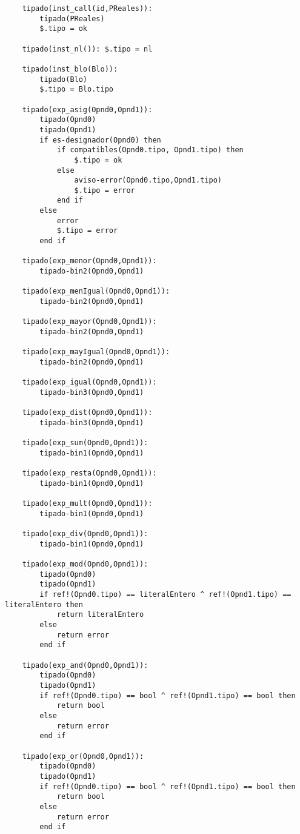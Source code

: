 \begin{lstlisting}
    tipado(inst_call(id,PReales)):
        tipado(PReales)
        $.tipo = ok

    tipado(inst_nl()): $.tipo = nl

    tipado(inst_blo(Blo)):
        tipado(Blo)
        $.tipo = Blo.tipo

    tipado(exp_asig(Opnd0,Opnd1)):
        tipado(Opnd0)
        tipado(Opnd1)
        if es-designador(Opnd0) then
            if compatibles(Opnd0.tipo, Opnd1.tipo) then
                $.tipo = ok
            else 
                aviso-error(Opnd0.tipo,Opnd1.tipo)
                $.tipo = error
            end if
        else
            error
            $.tipo = error
        end if

    tipado(exp_menor(Opnd0,Opnd1)):
        tipado-bin2(Opnd0,Opnd1)

    tipado(exp_menIgual(Opnd0,Opnd1)):
        tipado-bin2(Opnd0,Opnd1)

    tipado(exp_mayor(Opnd0,Opnd1)):
        tipado-bin2(Opnd0,Opnd1)

    tipado(exp_mayIgual(Opnd0,Opnd1)):
        tipado-bin2(Opnd0,Opnd1)

    tipado(exp_igual(Opnd0,Opnd1)):
        tipado-bin3(Opnd0,Opnd1)

    tipado(exp_dist(Opnd0,Opnd1)):
        tipado-bin3(Opnd0,Opnd1)

    tipado(exp_sum(Opnd0,Opnd1)):
        tipado-bin1(Opnd0,Opnd1)

    tipado(exp_resta(Opnd0,Opnd1)):
        tipado-bin1(Opnd0,Opnd1)

    tipado(exp_mult(Opnd0,Opnd1)):
        tipado-bin1(Opnd0,Opnd1)

    tipado(exp_div(Opnd0,Opnd1)):
        tipado-bin1(Opnd0,Opnd1)

    tipado(exp_mod(Opnd0,Opnd1)):
        tipado(Opnd0)
        tipado(Opnd1)
        if ref!(Opnd0.tipo) == literalEntero ^ ref!(Opnd1.tipo) == literalEntero then
            return literalEntero
        else 
            return error
        end if

    tipado(exp_and(Opnd0,Opnd1)):
        tipado(Opnd0)
        tipado(Opnd1)
        if ref!(Opnd0.tipo) == bool ^ ref!(Opnd1.tipo) == bool then
            return bool
        else 
            return error
        end if

    tipado(exp_or(Opnd0,Opnd1)):
        tipado(Opnd0)
        tipado(Opnd1)
        if ref!(Opnd0.tipo) == bool ^ ref!(Opnd1.tipo) == bool then
            return bool
        else 
            return error
        end if


\end{lstlisting}
